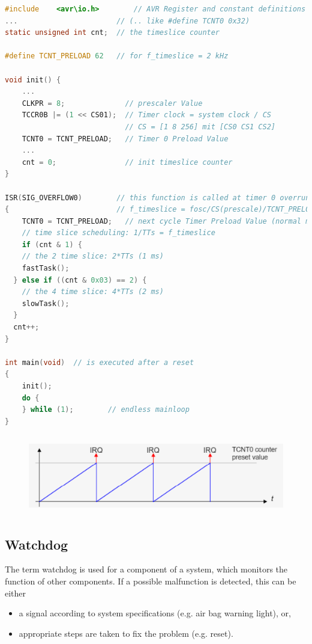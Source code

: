 \begin{lstlisting}[style=mystyle, language=c]
#include	<avr\io.h>		  // AVR Register and constant definitions
...                       // (.. like #define TCNT0 0x32)
static unsigned int cnt;  // the timeslice counter

#define TCNT_PRELOAD 62   // for f_timeslice = 2 kHz 

void init() {
	...
	CLKPR = 8;              // prescaler Value
	TCCR0B |= (1 << CS01);  // Timer clock = system clock / CS
	                     	// CS = [1 8 256] mit [CS0 CS1 CS2]
	TCNT0 = TCNT_PRELOAD;   // Timer 0 Preload Value
	...
	cnt = 0;                // init timeslice counter
}

ISR(SIG_OVERFLOW0)        // this function is called at timer 0 overrun
{                         // f_timeslice = fosc/CS(prescale)/TCNT_PRELOAD
	TCNT0 = TCNT_PRELOAD;   // next cycle Timer Preload Value (normal mode)
	// time slice scheduling: 1/TTs = f_timeslice
	if (cnt & 1) {
	// the 2 time slice: 2*TTs (1 ms)
	fastTask();                   
  } else if ((cnt & 0x03) == 2) {
	// the 4 time slice: 4*TTs (2 ms)
	slowTask();          
  }
  cnt++;
}

int main(void)  // is executed after a reset
{
	init();        
	do {
	} while (1);		// endless mainloop
}

\end{lstlisting}

    \begin{figure}[h]
    \centering
    \includegraphics[width=12cm, height=3.5cm]{Images/image163.png}
    \label{fig:Fig }
    \end{figure}
    
\subsection{Watchdog}

The term watchdog is used for a component of a system, which monitors the function of other components. If a possible malfunction is detected, this can be either 

\begin{itemize}
\item  a signal according to system specifications (e.g. air bag warning light), or, 
\item  appropriate steps are taken to fix the problem (e.g. reset).
\end{itemize}

